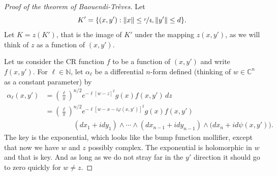 \documentclass[12pt,openany]{book}
\newcommand{\snorm}[1]{\lVert {#1} \rVert}
\newcommand{\C}{{\mathbb{C}}}
\newcommand{\N}{{\mathbb{N}}}
\theoremstyle{plain}
\theoremstyle{remark}
\theoremstyle{definition}
\theoremstyle{exercise}
\theoremstyle{example}
\begin{document}
\begin{proof}[Proof of the theorem of Baouendi-Tr{\`e}ves]
Let
\begin{equation*}
K' = \{ (x,y') : \snorm{x} \leq \nicefrac{r}{4} , \snorm{y'} \leq d \} .
\end{equation*}
Let $K = z(K')$, that is the image of $K'$ under the mapping $z(x,y')$,
as we will think of $z$ as a function of $(x,y')$.

Let us consider the CR function $f$ to be a function of $(x,y')$
and write $f(x,y')$.
For $\ell \in \N$,
let $\alpha_{\ell}$ be a differential $n$-form defined (thinking
of $w \in \C^n$ as a constant parameter) by
\begin{equation*}
\begin{split}
\alpha_{\ell}(x,y')
& =
{\left(\frac{\ell}{\pi}\right)}^{n/2}
e^{-\ell [w - z]^2} g(x) f(x,y')
\,
dz
\\
& =
{\left(\frac{\ell}{\pi}\right)}^{n/2}
e^{-\ell [w - x-i\varphi(x,y')]^2} g(x) f(x,y')
\\
& \qquad \qquad
(dx_1 + idy_1)  \wedge
\cdots \wedge
(dx_{n-1} + i dy_{n-1})
\wedge
\bigl(dx_{n} + i d \psi (x,y') \bigr) .
\end{split}
\end{equation*}
The key is the exponential, which looks like the bump function
mollifier, except that now we have $w$ and $z$
possibly complex.  The exponential is holomorphic in $w$ and that is key.  And as long as we
do not stray far in the $y'$ direction it should go to zero quickly for
$w\not=z$.


\end{proof}
\end{document}
